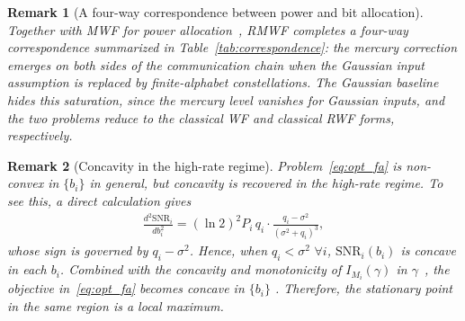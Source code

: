 \documentclass[10pt, twocolumn, comsoc]{IEEEtran}
\newtheorem{remark}{Remark}
\begin{document}
\begin{remark}[A four-way correspondence between power and bit allocation]
\normalfont
Together with MWF for power allocation~\cite{LozanoTulinoVerdu}, RMWF completes a four-way correspondence summarized in Table~\ref{tab:correspondence}: the mercury correction emerges on both sides of the communication chain when the Gaussian input assumption is replaced by finite-alphabet constellations.
The Gaussian baseline hides this saturation, since the mercury level vanishes for Gaussian inputs, and the two problems reduce to the classical WF and classical RWF forms, respectively.
\end{remark}

\begin{remark}[Concavity in the high-rate regime]
\label{rem:convexity_toy}
\normalfont
Problem~\eqref{eq:opt_fa} is non-convex in $\{b_i\}$ in general, but concavity is recovered in the high-rate regime. To see this, a direct calculation gives
\begin{align} \label{eq:snr_second_deriv}
    \frac{d^2 \mathrm{SNR}_i}{db_i^2} 
    = (\ln 2)^2 P_i\, q_i \cdot \frac{q_i - \sigma^2}{(\sigma^2 + q_i)^3},
\end{align}
whose sign is governed by $q_i - \sigma^2$. Hence, when $q_i < \sigma^2\, \,\forall i$, $\mathrm{SNR}_i(b_i)$ is concave in each $b_i$. Combined with the concavity and monotonicity of $I_{M_i}(\gamma)$ in $\gamma$~\cite{GuoShamaiVerdu}, the objective in~\eqref{eq:opt_fa} becomes concave in $\{b_i\}$ \cite{boyd2004convex}. 
Therefore, the stationary point in the same region is a local maximum.
\end{remark}
\end{document}
